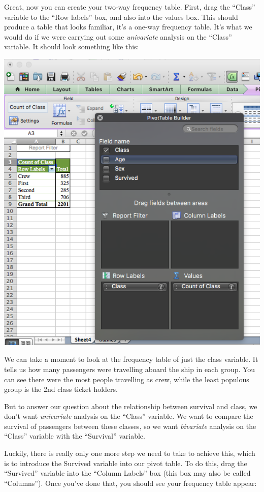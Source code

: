 \documentclass[
]{book}
\begin{document}
Great, now you can create your two-way frequency table. First, drag the ``Class'' variable to the ``Row labels'' box, and also into the values box. This should produce a table that looks familiar, it's a one-way frequency table. It's what we would do if we were carrying out some \emph{univariate} analysis on the ``Class'' variable. It should look something like this:

\includegraphics{imgs/class_uni.png}

We can take a moment to look at the frequency table of just the class variable. It tells us how many passengers were travelling aboard the ship in each group. You can see there were the most people travelling as crew, while the least populous group is the 2nd class ticket holders.

But to answer our question about the relationship between survival and class, we don't want \emph{univariate} analysis on the ``Class'' variable. We want to compare the survival of passengers between these classes, so we want \emph{bivariate} analysis on the ``Class'' variable with the ``Survival'' variable.

Luckily, there is really only one more step we need to take to achieve this, which is to introduce the Survived variable into our pivot table. To do this, drag the ``Survived'' variable into the ``Column Labels'' box (this box may also be called ``Columns''). Once you've done that, you should see your frequency table appear:
\end{document}
